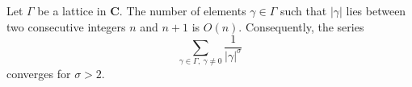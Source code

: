 Let $\Gamma$ be a lattice in $\mathbf{C}$. The number of elements $\gamma \in \Gamma$ such that $|\gamma|$ lies between two consecutive integers $n$ and $n+1$ is $O(n)$. Consequently, the series
$$\sum_{\gamma \in \Gamma,\ \gamma \neq 0} \frac{1}{|\gamma|^\sigma}$$
converges for $\sigma > 2$.
